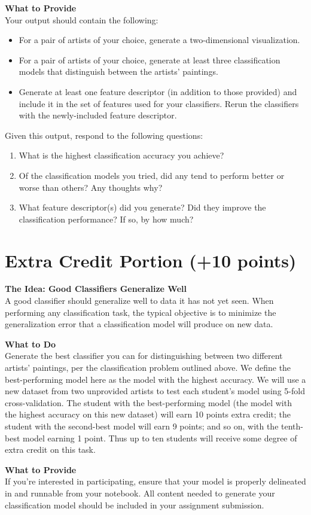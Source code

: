 \documentclass[paper=a4, fontsize=11pt]{scrartcl} %
\numberwithin{equation}{section} %
\numberwithin{figure}{section} %
\numberwithin{table}{section} %
\begin{document}
\textbf{What to Provide}\\
Your output should contain the following:
\begin{itemize}
\item For a pair of artists of your choice, generate a two-dimensional visualization.
\item For a pair of artists of your choice, generate at least three classification models that distinguish between the artists' paintings.
\item Generate at least one feature descriptor (in addition to those provided) and include it in the set of features used for your classifiers. Rerun the classifiers with the newly-included feature descriptor.
\end{itemize}
Given this output, respond to the following questions:
\begin{enumerate}
\item What is the highest classification accuracy you achieve?
\item Of the classification models you tried, did any tend to perform better or worse than others? Any thoughts why?
\item What feature descriptor(s) did you generate? Did they improve the classification performance? If so, by how much?
\end{enumerate}

\vspace{8pt}

\section{Extra Credit Portion (+10 points)}
\textbf{The Idea:  Good Classifiers Generalize Well}\\
A good classifier should generalize well to data it has not yet seen. When performing any classification task, the typical objective is to minimize the generalization error that a classification model will produce on new data.

\vspace{8pt}

\textbf{What to Do}\\
Generate the best classifier you can for distinguishing between two different artists' paintings, per the classification problem outlined above. We define the best-performing model here as the model with the highest accuracy. We will use a new dataset from two unprovided artists to test each student's model using 5-fold cross-validation. The student with the best-performing model (the model with the highest accuracy on this new dataset) will earn 10 points extra credit; the student with the second-best model will earn 9 points; and so on, with the tenth-best model earning 1 point. Thus up to ten students will receive some degree of extra credit on this task.

\vspace{8pt}

\textbf{What to Provide}\\
If you're interested in participating, ensure that your model is properly delineated in and runnable from your notebook. All content needed to generate your classification model should be included in your assignment submission.
\end{document}
